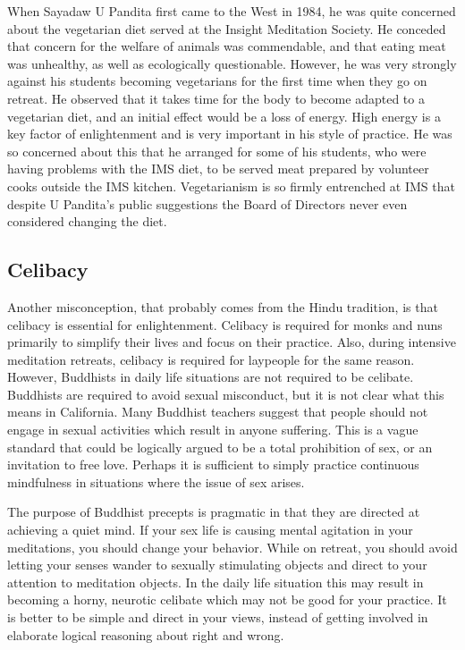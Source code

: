\documentclass[a5paper,10pt,english]{book}
\begin{document}
\sphinxAtStartPar
When Sayadaw U Pandita first came to the West in 1984, he was quite
concerned about the vegetarian diet served at the Insight Meditation
Society. He conceded that concern for the welfare of animals was
commendable, and that eating meat was unhealthy, as well as ecologically
questionable. However, he was very strongly against his students
becoming vegetarians for the first time when they go on retreat. He
observed that it takes time for the body to become adapted to a
vegetarian diet, and an initial effect would be a loss of energy. High
energy is a key factor of enlightenment and is very important in his
style of practice. He was so concerned about this that he arranged for
some of his students, who were having problems with the IMS diet, to be
served meat prepared by volunteer cooks outside the IMS kitchen.
Vegetarianism is so firmly entrenched at IMS that despite U Pandita’s
public suggestions the Board of Directors never even considered changing
the diet.


\subsection{Celibacy}
\label{\detokenize{saints:celibacy}}
\sphinxAtStartPar
Another misconception, that probably comes from the Hindu tradition, is
that celibacy is essential for enlightenment. Celibacy is required for
monks and nuns primarily to simplify their lives and focus on their
practice. Also, during intensive meditation retreats, celibacy is
required for laypeople for the same reason. However, Buddhists in daily
life situations are not required to be celibate. Buddhists are required
to avoid sexual misconduct, but it is not clear what this means in
California. Many Buddhist teachers suggest that people should not engage
in sexual activities which result in anyone suffering. This is a vague
standard that could be logically argued to be a total prohibition of
sex, or an invitation to free love. Perhaps it is sufficient to simply
practice continuous mindfulness in situations where the issue of sex
arises.

\sphinxAtStartPar
The purpose of Buddhist precepts is pragmatic in that they are directed
at achieving a quiet mind. If your sex life is causing mental agitation
in your meditations, you should change your behavior. While on retreat,
you should avoid letting your senses wander to sexually stimulating
objects and direct to your attention to meditation objects. In the daily
life situation this may result in becoming a horny, neurotic celibate
which may not be good for your practice. It is better to be simple and
direct in your views, instead of getting involved in elaborate logical
reasoning about right and wrong.
\end{document}
